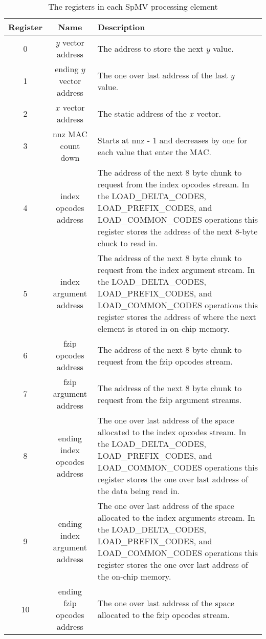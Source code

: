 \begin{table}
    \centering
    \caption{The registers in each SpMV processing element}
    \label{tbl:registers}
    \begin{tabular}{|c|c|m{8cm}|}
        \hline
        Register & Name & Description\\
        \hline
        0 & $y$ vector address & The address to store the next $y$ value. \\
        \hline
        1 & ending $y$ vector address & The one over last address of the last $y$ value.\\
        \hline
        2 & $x$ vector address & The static address of the $x$ vector.\\
        \hline
        3 & nnz MAC count down & Starts at nnz - 1 and decreases by one for each value that enter the MAC.\\
        \hline
        4 & index opcodes address & The address of the next 8 byte chunk to request from the index opcodes stream. In the LOAD\_DELTA\_CODES, LOAD\_PREFIX\_CODES, and LOAD\_COMMON\_CODES operations this register stores the address of the next 8-byte chuck to read in.\\
        \hline
        5 & index argument address & The address of the next 8 byte chunk to request from the index argument stream. In the LOAD\_DELTA\_CODES, LOAD\_PREFIX\_CODES, and LOAD\_COMMON\_CODES operations this register stores the address of where the next element is stored in on-chip memory.\\
        \hline
        6 & fzip opcodes address & The address of the next 8 byte chunk to request from the fzip opcodes stream.\\
        \hline
        7 & fzip argument address & The address of the next 8 byte chunk to request from the fzip argument streams.\\
        \hline
        8 & ending index opcodes address & The one over last address of the space allocated to the index opcodes stream. In the LOAD\_DELTA\_CODES, LOAD\_PREFIX\_CODES, and LOAD\_COMMON\_CODES operations this register stores the one over last address of the data being read in.\\
        \hline
        9 & ending index argument address & The one over last address of the space allocated to the index arguments stream. In the LOAD\_DELTA\_CODES, LOAD\_PREFIX\_CODES, and LOAD\_COMMON\_CODES operations this register stores the one over last address of the on-chip memory.\\
        \hline
        10 & ending fzip opcodes address & The one over last address of the space allocated to the fzip opcodes stream.\\

\end{tabular}
\end{table}
